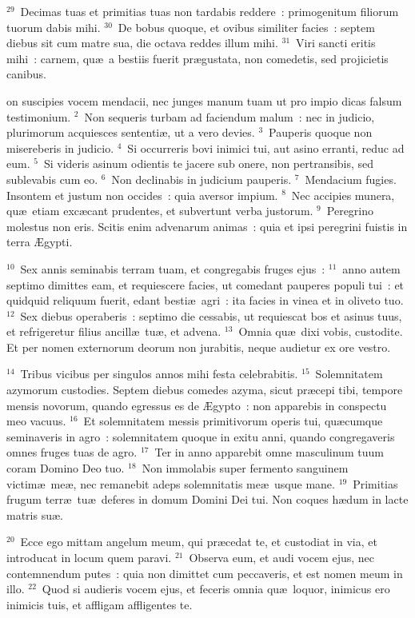 ${}^{29}$~Decimas tuas et primitias tuas non tardabis reddere~: primogenitum filiorum tuorum dabis mihi.
${}^{30}$~De bobus quoque, et ovibus similiter facies~: septem diebus sit cum matre sua, die octava reddes illum mihi.
${}^{31}$~Viri sancti eritis mihi~: carnem, qu\ae\ a bestiis fuerit pr\ae gustata, non comedetis, sed projicietis canibus.

\bchapter
{}on suscipies vocem mendacii, nec junges manum tuam ut pro impio dicas falsum testimonium.
${}^{2}$~Non sequeris turbam ad faciendum malum~: nec in judicio, plurimorum acquiesces sententi\ae , ut a vero devies.
${}^{3}$~Pauperis quoque non misereberis in judicio.
${}^{4}$~Si occurreris bovi inimici tui, aut asino erranti, reduc ad eum.
${}^{5}$~Si videris asinum odientis te jacere sub onere, non pertransibis, sed sublevabis cum eo.
${}^{6}$~Non declinabis in judicium pauperis.
${}^{7}$~Mendacium fugies. Insontem et justum non occides~: quia aversor impium.
${}^{8}$~Nec accipies munera, qu\ae\ etiam exc\ae cant prudentes, et subvertunt verba justorum.
${}^{9}$~Peregrino molestus non eris. Scitis enim advenarum animas~: quia et ipsi peregrini fuistis in terra \AE gypti.


${}^{10}$~Sex annis seminabis terram tuam, et congregabis fruges ejus~:
${}^{11}$~anno autem septimo dimittes eam, et requiescere facies, ut comedant pauperes populi tui~: et quidquid reliquum fuerit, edant besti\ae\ agri~: ita facies in vinea et in oliveto tuo.
${}^{12}$~Sex diebus operaberis~: septimo die cessabis, ut requiescat bos et asinus tuus, et refrigeretur filius ancill\ae\ tu\ae , et advena.
${}^{13}$~Omnia qu\ae\ dixi vobis, custodite. Et per nomen externorum deorum non jurabitis, neque audietur ex ore vestro.


${}^{14}$~Tribus vicibus per singulos annos mihi festa celebrabitis.
${}^{15}$~Solemnitatem azymorum custodies. Septem diebus comedes azyma, sicut pr\ae cepi tibi, tempore mensis novorum, quando egressus es de \AE gypto~: non apparebis in conspectu meo vacuus.
${}^{16}$~Et solemnitatem messis primitivorum operis tui, qu\ae cumque seminaveris in agro~: solemnitatem quoque in exitu anni, quando congregaveris omnes fruges tuas de agro.
${}^{17}$~Ter in anno apparebit omne masculinum tuum coram Domino Deo tuo.
${}^{18}$~Non immolabis super fermento sanguinem victim\ae\ me\ae , nec remanebit adeps solemnitatis me\ae\ usque mane.
${}^{19}$~Primitias frugum terr\ae\ tu\ae\ deferes in domum Domini Dei tui. Non coques h\ae dum in lacte matris su\ae .


${}^{20}$~Ecce ego mittam angelum meum, qui pr\ae cedat te, et custodiat in via, et introducat in locum quem paravi.
${}^{21}$~Observa eum, et audi vocem ejus, nec contemnendum putes~: quia non dimittet cum peccaveris, et est nomen meum in illo.
${}^{22}$~Quod si audieris vocem ejus, et feceris omnia qu\ae\ loquor, inimicus ero inimicis tuis, et affligam affligentes te.


